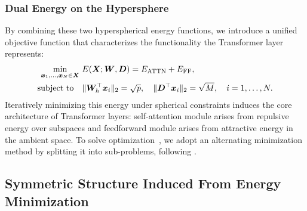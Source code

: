 \subsubsection{Dual Energy on the Hypersphere}
\label{section:symmetric structure induced from energy minimization}
By combining these two hyperspherical energy functions, we introduce a unified objective function that characterizes the functionality the Transformer layer represents:
\begin{align}
\label{eq:5}
    \min_{{\bm{x}}_1, \dots,{\bm{x}}_N \in {\bm{X}}} ~ & E({\bm{X}} ; {\bm{W}}, {\bm{D}}) = E_{\text{ATTN}} + E_{\text{FF}}, \\
    \text{subject to} \quad & \|{\bm{W}}_h^\top{\bm{x}}_i\|_2 = \sqrt{p}, \quad \|{\bm{D}}^\top{\bm{x}}_i\|_2 = \sqrt{M}, \quad i = 1, \dots, N. \nonumber
\end{align}
Iteratively minimizing this energy under spherical constraints induces the core architecture of Transformer layers: self-attention module arises from repulsive energy over subspaces and feedforward module arises from attractive energy in the ambient space. To solve optimization~, we adopt an alternating minimization method by splitting it into sub-problems, following \citet{yu2023white}. 

\subsection{Symmetric Structure Induced From Energy Minimization}
